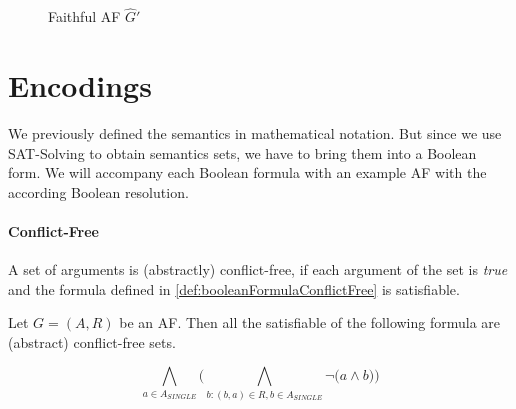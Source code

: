 \begin{figure}[H]
    \centering
    \caption{Faithful AF $\hat{G}'$}
    \label{af:algorithmConcretizer4}
\end{figure}



\newpage

\section{Encodings}
\label{sec:Encodings}
We previously defined the semantics in mathematical notation. But since we use SAT-Solving to obtain semantics sets, we have to bring them into a Boolean form. We will accompany each Boolean formula with an example AF with the according Boolean resolution.


\paragraph{Conflict-Free} A set of arguments is (abstractly) conflict-free, if each argument of the set is \emph{true} and the formula defined in \cref{def:booleanFormulaConflictFree} is satisfiable.

\begin{definition}
    Let $G=(A,R)$ be an AF. Then all the satisfiable of the following formula are (abstract) conflict-free sets.
    \begin{center}
        \[
        \bigwedge_{a \in A_{\!S\!I\!N\!G\!L\!E}} \bigl( \bigwedge_{b:(b,a)\in R, b \in A_{\!S\!I\!N\!G\!L\!E}} \lnot \bigl( a \wedge b \bigl) \bigl)
        \]
    \end{center}
    \label{def:booleanFormulaConflictFree}
\end{definition}


